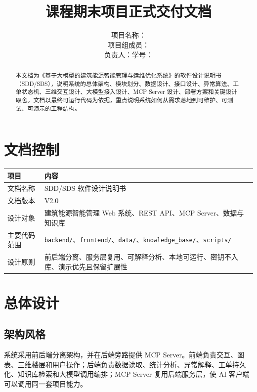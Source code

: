 \documentclass[12pt,a4paper]{ctexart}
\title{
    \vspace{-2em}
    \heiti \zihao{2} \reporttitle \\
    \vspace{1em}
    \zihao{4} 课程期末项目正式交付文档
}
\author{
    \songti \zihao{4}
    项目名称：\projectname \\
    项目组成员：\teamname \\
    负责人：\studentname \quad 学号：\studentid
}
\date{\docdate}
\newcommand{\projectname}{基于大模型的建筑能源智能管理与运维优化系统}
\newcommand{\docversion}{V2.0}
\newcommand{\code}[1]{{\footnotesize\nolinkurl{#1}}}
\begin{document}
\maketitle
\thispagestyle{fancy}

\begin{abstract}
本文档为《\projectname》的软件设计说明书（SDD/SDS），说明系统的总体架构、模块划分、数据设计、接口设计、异常算法、工单状态机、三维交互设计、大模型接入设计、MCP Server 设计、部署方案和关键设计取舍。文档以最终可运行代码为依据，重点说明系统如何从需求落地到可维护、可测试、可演示的工程结构。
\end{abstract}

\tableofcontents
\newpage

\section{文档控制}
\begin{longtable}{p{4cm}p{10.5cm}}
\toprule
项目 & 内容 \\
\midrule
文档名称 & SDD/SDS 软件设计说明书 \\
文档版本 & \docversion \\
设计对象 & 建筑能源智能管理 Web 系统、REST API、MCP Server、数据与知识库 \\
主要代码范围 & \code{backend/}、\code{frontend/}、\code{data/}、\code{knowledge_base/}、\code{scripts/} \\
设计原则 & 前后端分离、服务层复用、可解释分析、本地可运行、密钥不入库、演示优先且保留扩展性 \\
\bottomrule
\end{longtable}

\section{总体设计}
\subsection{架构风格}
系统采用前后端分离架构，并在后端旁路提供 MCP Server。前端负责交互、图表、三维楼层和用户操作；后端负责数据读取、统计分析、异常解释、工单持久化、知识库检索和大模型调用编排；MCP Server 复用后端服务层，使 AI 客户端可以调用同一套项目能力。
\end{document}
